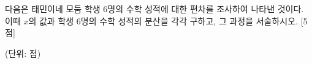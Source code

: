 다음은 태민이네 모둠 학생 $6$명의 수학 성적에 대한 편차를 조사하여 나타낸 것이다. 이때 $x$의 값과 학생 $6$명의 수학 성적의 분산을 각각 구하고, 그 과정을 서술하시오. \mbox{[5점]}\par\noindent\hfill{\footnotesize (단위: 점)}
